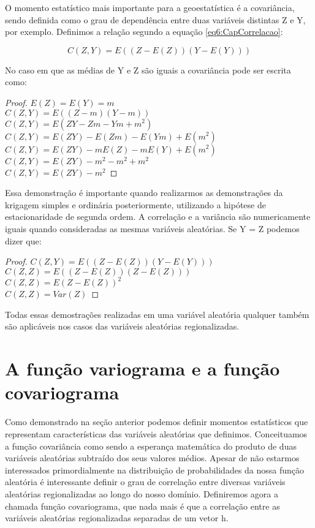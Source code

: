 O momento estatístico mais importante para a geoestatística é a covariância, sendo definida como o grau de dependência entre duas variáveis distintas Z e Y, por exemplo. Definimos a relação segundo a equação \eqref{eq6:CapCorrelacao}: 

\begin{equation}\label{eq6:CapCorrelacao}
C\left(Z,Y\right)= E\left( (Z-E(Z)) (Y-E(Y)) \right)
\end{equation}

No caso em que as médias de Y e Z são iguais a covariância pode ser escrita como: 
\begin{proof}
$E(Z) = E(Y) = m $
\\$C\left(Z,Y\right)= E\left( (Z-m) (Y-m) \right)$
\\$C\left(Z,Y\right)= E\left( ZY - Zm - Ym +m^2 \right)$
\\$C\left(Z,Y\right)= E(ZY) - E(Zm) - E(Ym) +E(m^2) $
\\$C\left(Z,Y\right)= E(ZY) - mE(Z) - mE(Y) +E(m^2) $
\\$C\left(Z,Y\right)= E(ZY) - m^2 - m^2 +m^2$
\\$C\left(Z,Y\right)= E(ZY) - m^2$
\end{proof}

Essa demonstração é importante quando realizarmos as demonstrações da krigagem simples e ordinária posteriormente, utilizando a hipótese de estacionaridade de segunda ordem. A correlação e a variância são numericamente iguais quando consideradas as mesmas variáveis aleatórias. Se Y = Z podemos dizer que:

\begin{proof}
$ C\left(Z,Y\right) = E\left( (Z-E(Z)) (Y-E(Y)) \right) $
\\$C\left(Z,Z\right) = E\left( (Z-E(Z))(Z-E(Z)) \right)$
\\$C\left(Z,Z\right) = E\left( Z-E(Z) \right)^2$
\\$C\left(Z,Z\right) = Var(Z)$
\end{proof}

Todas essas demostrações realizadas em uma variável aleatória qualquer também são aplicáveis nos casos das variáveis aleatórias regionalizadas. 

\section{A função variograma e a função covariograma}

Como demonstrado na seção anterior podemos definir momentos estatísticos que representam características das variáveis aleatórias que definimos. Conceituamos a função covariância como sendo a esperança matemática do produto de duas variáveis aleatórias subtraído dos seus valores médios. Apesar de não estarmos interessados primordialmente na distribuição de probabilidades da nossa função aleatória é interessante definir o grau de correlação entre diversas variáveis aleatórias regionalizadas ao longo do nosso domínio. Definiremos agora a chamada função covariograma, que nada mais é que a correlação entre as variáveis aleatórias regionalizadas separadas de um vetor h.  

